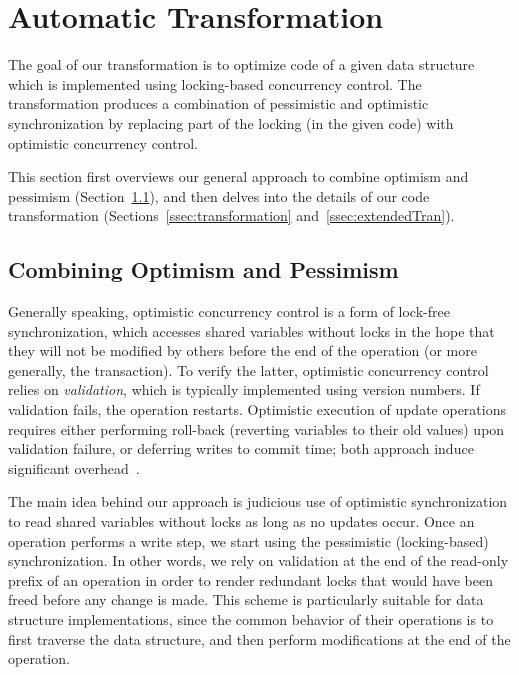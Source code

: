 \renewcommand{\ttdefault}{pcr}
\algrenewcommand{}
\algrenewcommand{}
\algrenewcommand{}
\algrenewcommand{}
\algrenewcommand{}
\algrenewcommand\textproc{\textit}



\section{Automatic Transformation}\label{sec:algorithm}

The goal of our transformation is to optimize code of a given data structure which is implemented using locking-based concurrency control.
The transformation produces a combination of pessimistic and optimistic synchronization
by replacing part of the  locking (in the given code) with optimistic concurrency control.


This section first overviews our general approach to combine optimism and pessimism (Section~\ref{ssec:overview}), and
then delves into the details of our code transformation (Sections~\ref{ssec:transformation} and~\ref{ssec:extendedTran}).


\subsection{Combining Optimism and Pessimism}\label{ssec:overview}

Generally speaking, optimistic concurrency control is a form of lock-free synchronization, which accesses shared variables without locks in the hope that they will not be modified by others before the end of the operation (or more generally, the transaction). To verify the latter, optimistic concurrency control relies on \emph{validation}, which is typically implemented using version numbers. If validation fails, the operation restarts. Optimistic execution of update operations requires either performing roll-back (reverting variables to their old values) upon validation failure, or deferring writes to commit time; both approach induce significant overhead~\cite{Cascaval:2008}.



The main idea behind our approach is judicious use of optimistic synchronization to read
shared variables without locks as long as no updates occur. Once an operation
performs a write step, we start using the pessimistic (locking-based) synchronization. In
other words, we rely on validation at the end of the read-only prefix of an operation in order to render redundant
locks that would have been freed
before any change is made.
This scheme is particularly suitable for data structure implementations,
since the common behavior of their operations
is to first traverse the data structure, and then
perform modifications at the end of the operation.



